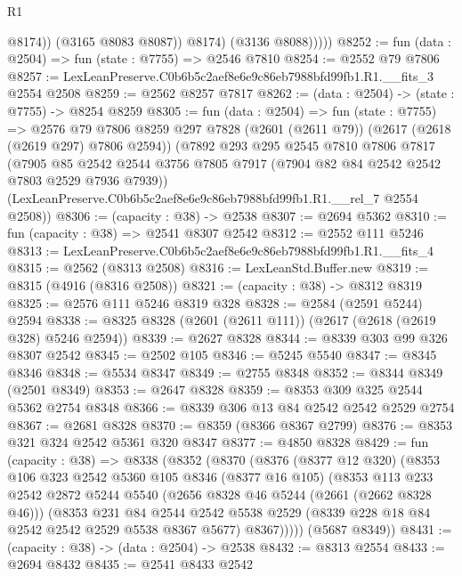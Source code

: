\begin{lexlean}{R1}
\begin{coremodule}
                    @8174))
                (@3165 @8083 @8087))
              @8174)
            (@3136 @8088)))))
@8252 := fun (data : @2504) => fun (state : @7755) => @2546 @7810
@8254 := @2552 @79 @7806
@8257 := LexLeanPreserve.C0b6b5c2aef8e6e9c86eb7988bfd99fb1.R1.__fits_3 @2554 @2508
@8259 := @2562 @8257 @7817
@8262 := (data : @2504) -> (state : @7755) -> @8254 @8259
@8305 := fun (data : @2504) =>
  fun (state : @7755) =>
  @2576
    @79
    @7806
    @8259
    @297
    @7828
    (@2601 (@2611 @79))
    (@2617 (@2618 (@2619 @297) @7806 @2594))
    (@7892
      @293
      @295
      @2545
      @7810
      @7806
      @7817
      (@7905 @85 @2542 @2544 @3756 @7805 @7917 (@7904 @82 @84 @2542 @2542 @7803 @2529 @7936 @7939))
      (LexLeanPreserve.C0b6b5c2aef8e6e9c86eb7988bfd99fb1.R1.__rel_7 @2554 @2508))
@8306 := (capacity : @38) -> @2538
@8307 := @2694 @5362
@8310 := fun (capacity : @38) => @2541 @8307 @2542
@8312 := @2552 @111 @5246
@8313 := LexLeanPreserve.C0b6b5c2aef8e6e9c86eb7988bfd99fb1.R1.__fits_4
@8315 := @2562 (@8313 @2508)
@8316 := LexLeanStd.Buffer.new
@8319 := @8315 (@4916 (@8316 @2508))
@8321 := (capacity : @38) -> @8312 @8319
@8325 := @2576 @111 @5246 @8319 @328
@8328 := @2584 (@2591 @5244) @2594
@8338 := @8325 @8328 (@2601 (@2611 @111)) (@2617 (@2618 (@2619 @328) @5246 @2594))
@8339 := @2627 @8328
@8344 := @8339 @303 @99 @326 @8307 @2542
@8345 := @2502 @105
@8346 := @5245 @5540
@8347 := @8345 @8346
@8348 := @5534 @8347
@8349 := @2755 @8348
@8352 := @8344 @8349 (@2501 @8349)
@8353 := @2647 @8328
@8359 := @8353 @309 @325 @2544 @5362 @2754 @8348
@8366 := @8339 @306 @13 @84 @2542 @2542 @2529 @2754
@8367 := @2681 @8328
@8370 := @8359 (@8366 @8367 @2799)
@8376 := @8353 @321 @324 @2542 @5361 @320 @8347
@8377 := @4850 @8328
@8429 := fun (capacity : @38) =>
  @8338
    (@8352
      (@8370
        (@8376
          (@8377 @12 @320)
          (@8353
            @106
            @323
            @2542
            @5360
            @105
            @8346
            (@8377 @16 @105)
            (@8353
              @113
              @233
              @2542
              @2872
              @5244
              @5540
              (@2656 @8328 @46 @5244 (@2661 (@2662 @8328 @46)))
              (@8353
                @231
                @84
                @2544
                @2542
                @5538
                @2529
                (@8339 @228 @18 @84 @2542 @2542 @2529 @5538 @8367 @5677)
                @8367)))))
      (@5687 @8349))
@8431 := (capacity : @38) -> (data : @2504) -> @2538
@8432 := @8313 @2554
@8433 := @2694 @8432
@8435 := @2541 @8433 @2542

\end{coremodule}
\end{lexlean}
